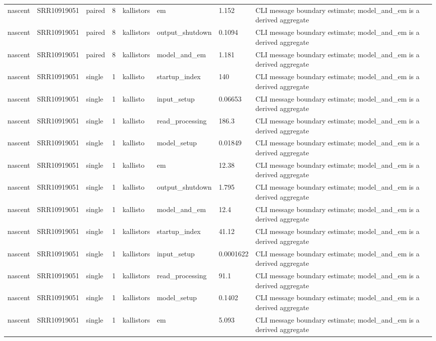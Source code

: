 \begin{tabular}{llllllll}
nascent & SRR10919051 & paired & 8 & kallistors & em & 1.152 & CLI message boundary estimate; model\_and\_em is a derived aggregate \\
nascent & SRR10919051 & paired & 8 & kallistors & output\_shutdown & 0.1094 & CLI message boundary estimate; model\_and\_em is a derived aggregate \\
nascent & SRR10919051 & paired & 8 & kallistors & model\_and\_em & 1.181 & CLI message boundary estimate; model\_and\_em is a derived aggregate \\
nascent & SRR10919051 & single & 1 & kallisto & startup\_index & 140 & CLI message boundary estimate; model\_and\_em is a derived aggregate \\
nascent & SRR10919051 & single & 1 & kallisto & input\_setup & 0.06653 & CLI message boundary estimate; model\_and\_em is a derived aggregate \\
nascent & SRR10919051 & single & 1 & kallisto & read\_processing & 186.3 & CLI message boundary estimate; model\_and\_em is a derived aggregate \\
nascent & SRR10919051 & single & 1 & kallisto & model\_setup & 0.01849 & CLI message boundary estimate; model\_and\_em is a derived aggregate \\
nascent & SRR10919051 & single & 1 & kallisto & em & 12.38 & CLI message boundary estimate; model\_and\_em is a derived aggregate \\
nascent & SRR10919051 & single & 1 & kallisto & output\_shutdown & 1.795 & CLI message boundary estimate; model\_and\_em is a derived aggregate \\
nascent & SRR10919051 & single & 1 & kallisto & model\_and\_em & 12.4 & CLI message boundary estimate; model\_and\_em is a derived aggregate \\
nascent & SRR10919051 & single & 1 & kallistors & startup\_index & 41.12 & CLI message boundary estimate; model\_and\_em is a derived aggregate \\
nascent & SRR10919051 & single & 1 & kallistors & input\_setup & 0.0001622 & CLI message boundary estimate; model\_and\_em is a derived aggregate \\
nascent & SRR10919051 & single & 1 & kallistors & read\_processing & 91.1 & CLI message boundary estimate; model\_and\_em is a derived aggregate \\
nascent & SRR10919051 & single & 1 & kallistors & model\_setup & 0.1402 & CLI message boundary estimate; model\_and\_em is a derived aggregate \\
nascent & SRR10919051 & single & 1 & kallistors & em & 5.093 & CLI message boundary estimate; model\_and\_em is a derived aggregate \\

\end{tabular}
